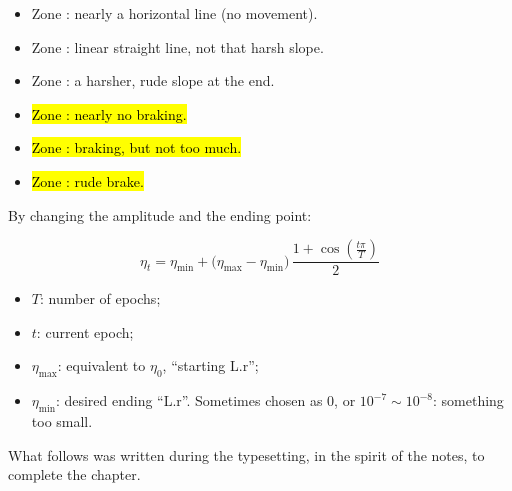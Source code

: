 \begin{itemize}
  \item Zone : nearly a horizontal line (no movement).
  \item Zone : linear straight line, not that harsh slope.
  \item Zone : a harsher, rude slope at the end.
\end{itemize}

\begin{itemize}
  \item \hl{Zone : nearly no braking.}
  \item \hl{Zone : braking, but not too much.}
  \item \hl{Zone : rude brake.}
\end{itemize}

By changing the amplitude and the ending point:
\begin{keyformula}
\[
\eta_t=\eta_{\min}+\bigl(\eta_{\max}-\eta_{\min}\bigr)\,\frac{1+\cos\!\left(\frac{t\pi}{T}\right)}{2}
\]
\end{keyformula}
\begin{itemize}
  \item $T$: number of epochs;
  \item $t$: current epoch;
  \item $\eta_{\max}$: equivalent to $\eta_0$, ``starting L.r'';
  \item $\eta_{\min}$: desired ending ``L.r''. Sometimes chosen as 0, or $10^{-7}\sim10^{-8}$: something too small.
\end{itemize}

\begin{center}
\end{center}

\clearpage
{}

\begin{tcolorbox}[colback=inkpurple!4,borderline west={3pt}{0pt}{inkpurple},title={\itshape\color{inkpurple}The notes stop at the title ``Def 5: Warm Up''.},colbacktitle=inkpurple!4,coltitle=inkpurple,attach title to upper,after title={\ }]
What follows was written during the typesetting, in the spirit of the notes, to complete the chapter.
\end{tcolorbox}


